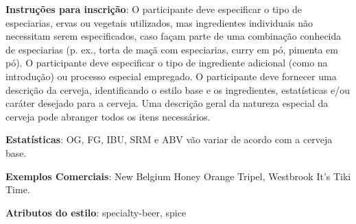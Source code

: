 \textbf{Instruções para inscrição}: O participante deve especificar o tipo de especiarias, ervas ou vegetais utilizados, mas ingredientes individuais não necessitam serem especificados, caso façam parte de uma combinação conhecida de especiarias (p. ex., torta de maçã com especiarias, curry em pó, pimenta em pó). O participante deve especificar o tipo de ingrediente adicional (como na introdução) ou processo especial empregado. O participante deve fornecer uma descrição da cerveja, identificando o estilo base e os ingredientes, estatísticas e/ou caráter desejado para a cerveja. Uma descrição geral da natureza especial da cerveja pode abranger todos os itens necessários.

\textbf{Estatísticas}: OG, FG, IBU, SRM e ABV vão variar de acordo com a cerveja base.

\textbf{Exemplos Comerciais}: New Belgium Honey Orange Tripel, Westbrook It's Tiki Time.

\textbf{Atributos do estilo}: specialty-beer, spice
